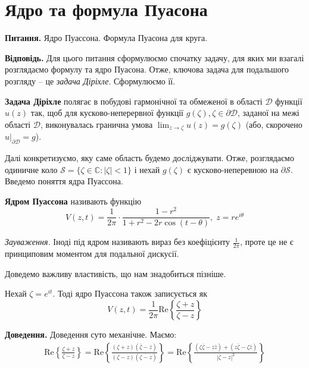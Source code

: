 \documentclass[14pt]{extarticle}
\newcommand{\<}{\langle}
\renewcommand{\>}{\rangle}
\theoremstyle{mystyle}{\newtheorem{definition}{Definition}[section]}
\theoremstyle{mystyle}{\newtheorem{proposition}[definition]{Proposition}}
\theoremstyle{mystyle}{\newtheorem{theorem}[definition]{Theorem}}
\theoremstyle{mystyle}{\newtheorem{lemma}[definition]{Lemma}}
\theoremstyle{mystyle}{\newtheorem{corollary}[definition]{Corollary}}
\theoremstyle{mystyle}{\newtheorem*{remark}{Remark}}
\theoremstyle{mystyle}{\newtheorem*{remarks}{Remarks}}
\theoremstyle{mystyle}{\newtheorem*{example}{Example}}
\theoremstyle{mystyle}{\newtheorem*{examples}{Examples}}
\theoremstyle{definition}{\newtheorem*{exercise}{Exercise}}
\theoremstyle{cstyle}{\newtheorem*{cthm}{}}
\theoremstyle{warn}
\begin{document}
\section{Ядро та формула Пуасона}

\textbf{Питання.} Ядро Пуассона. Формула Пуасона для круга.

\textbf{Відповідь.} Для цього питання сформулюємо спочатку задачу, для яких ми взагалі розглядаємо формулу та ядро Пуасона. Отже, ключова задача для подальшого розгляду -- це \textit{задача Діріхле}. Сформулюємо її.

\begin{definition}\label{def:dirichle}
    \textbf{Задача Діріхле} полягає в побудові гармонічної та обмеженої в області $\mathcal{D}$ функції $u(z)$ так, щоб для кусково-неперервної функції $g(\zeta), \zeta \in \partial\mathcal{D}$, заданої на межі області $\mathcal{D}$, виконувалась гранична умова $\lim_{z \to \zeta}u(z) = g(\zeta)$ (або, скорочено $u\Big|_{\partial\mathcal{D}}=g$). 
\end{definition}

Далі конкретизуємо, яку саме область будемо досліджувати. Отже, розглядаємо одиничне коло $\mathcal{S} = \{\zeta \in \mathbb{C}: |\zeta|<1\}$ і нехай $g(\zeta)$ є кусково-неперевною на $\partial\mathcal{S}$. Введемо поняття ядра Пуассона.

\begin{definition}
    \textbf{Ядром Пуассона} називають функцію 
    \begin{equation}
        V(z, t) = \frac{1}{2\pi} \cdot \frac{1-r^2}{1+r^2-2r\cos (t-\theta)}, \; z = re^{i\theta}
    \end{equation}

    \textit{Зауваження.} Іноді під ядром називають вираз без коефіцієнту $\frac{1}{2\pi}$, проте це не є принциповим моментом для подальної дискусії.
\end{definition}

Доведемо важливу властивість, що нам знадобиться пізніше.

\begin{lemma}
    Нехай $\zeta=e^{it}$. Тоді ядро Пуассона також записується як
    \begin{equation}
        V(z,t) = \frac{1}{2\pi}\text{Re} \left\{\frac{\zeta+z}{\zeta-z}\right\}
    \end{equation}
\end{lemma}

\textbf{Доведення.} Доведення суто механічне. Маємо:
\begin{gather}
    \text{Re}\left\{\frac{\zeta + z}{\zeta -z}\right\} = \text{Re}\left\{\frac{(\zeta+z)(\overline{\zeta} - \overline{z})}{(\zeta - z)(\overline{\zeta-z})}\right\} = \text{Re}\left\{\frac{(\zeta\overline{\zeta} - z\overline{z}) + (z\overline{\zeta} - \zeta\overline{z})}{|\zeta - z|^2}\right\}
\end{gather}
\end{document}
